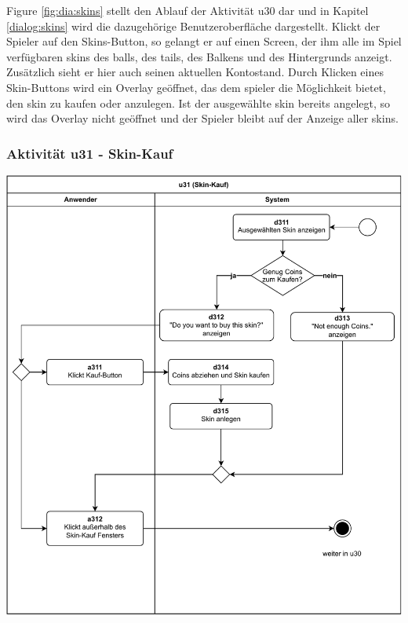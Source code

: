Figure \ref{fig:dia:skins} stellt den Ablauf der Aktivität u30 dar und in Kapitel \ref{dialog:skins} wird die dazugehörige Benutzeroberfläche dargestellt.
Klickt der Spieler auf den Skins-Button, so gelangt er auf einen Screen, der ihm alle im Spiel verfügbaren \glspl{skin} des \glspl{ball}, des \glspl{tail}, des Balkens und des Hintergrunds anzeigt. Zusätzlich sieht er hier auch seinen aktuellen Kontostand. Durch Klicken eines Skin-Buttons wird ein Overlay geöffnet, das dem \gls{spieler} die Möglichkeit bietet, den \gls{skin} zu kaufen oder anzulegen. Ist der ausgewählte \gls{skin} bereits angelegt, so wird das Overlay nicht geöffnet und der Spieler bleibt auf der Anzeige aller \glspl{skin}.
\clearpage

\subsubsection{Aktivität u31 - Skin-Kauf}

\vspace*{1cm}

\includegraphics[width=\linewidth]{diagramme/pdf/UML-Activity-u31.pdf}
\label{fig:dia:skinPurchase}
\vspace*{0.5cm}

